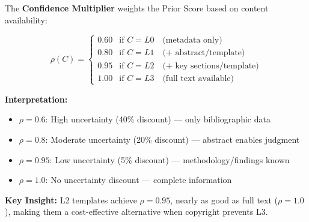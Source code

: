 \begin{tcolorbox}[colback=yellow!5!white, colframe=yellow!75!black,
    title=\textbf{Definition 2b: Confidence Multiplier $\rho: C \to [0.6, 1.0]$}]

The \textbf{Confidence Multiplier} weights the Prior Score based on content availability:

\begin{equation}
\rho(C) = \begin{cases}
0.60 & \text{if } C = L0 \quad \text{(metadata only)} \\
0.80 & \text{if } C = L1 \quad \text{(+ abstract/template)} \\
0.95 & \text{if } C = L2 \quad \text{(+ key sections/template)} \\
1.00 & \text{if } C = L3 \quad \text{(full text available)}
\end{cases}
\end{equation}

\textbf{Interpretation:}
\begin{itemize}[nosep]
    \item $\rho = 0.6$: High uncertainty (40\% discount) --- only bibliographic data
    \item $\rho = 0.8$: Moderate uncertainty (20\% discount) --- abstract enables judgment
    \item $\rho = 0.95$: Low uncertainty (5\% discount) --- methodology/findings known
    \item $\rho = 1.0$: No uncertainty discount --- complete information
\end{itemize}

\textbf{Key Insight:} L2 templates achieve $\rho = 0.95$, nearly as good as full text ($\rho = 1.0$),
making them a cost-effective alternative when copyright prevents L3.

\end{tcolorbox}

